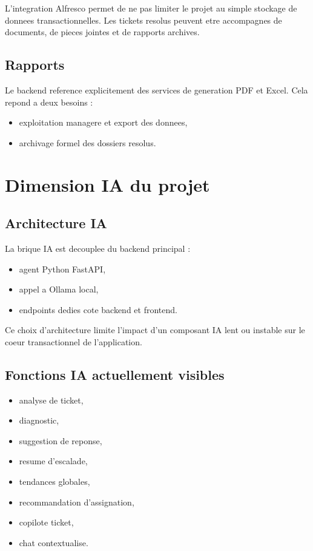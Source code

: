 \documentclass[12pt,a4paper]{article}
\begin{document}
L'integration Alfresco permet de ne pas limiter le projet au simple stockage de donnees transactionnelles. Les tickets resolus peuvent etre accompagnes de documents, de pieces jointes et de rapports archives.

\subsection{Rapports}

Le backend reference explicitement des services de generation PDF et Excel. Cela repond a deux besoins :

\begin{itemize}[leftmargin=1.2cm]
  \item exploitation managere et export des donnees,
  \item archivage formel des dossiers resolus.
\end{itemize}

\section{Dimension IA du projet}

\subsection{Architecture IA}

La brique IA est decouplee du backend principal :

\begin{itemize}[leftmargin=1.2cm]
  \item agent Python FastAPI,
  \item appel a Ollama local,
  \item endpoints dedies cote backend et frontend.
\end{itemize}

Ce choix d'architecture limite l'impact d'un composant IA lent ou instable sur le coeur transactionnel de l'application.

\subsection{Fonctions IA actuellement visibles}

\begin{itemize}[leftmargin=1.2cm]
  \item analyse de ticket,
  \item diagnostic,
  \item suggestion de reponse,
  \item resume d'escalade,
  \item tendances globales,
  \item recommandation d'assignation,
  \item copilote ticket,
  \item chat contextualise.
\end{itemize}
\end{document}
